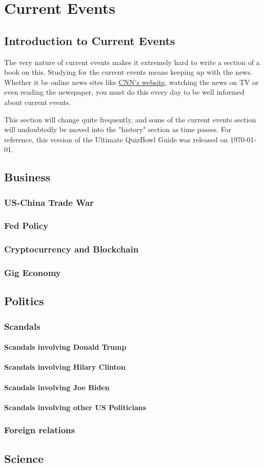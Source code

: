 \chapter{Current Events}
	\section{Introduction to Current Events}
		The very nature of current events makes it extremely hard to write a section of a book on this.  Studying for the current events means keeping up with the news.  Whether it be online news sites like \href{http://www.cnn.com}{CNN's website}, watching the news on TV or even reading the newspaper, you must do this every day to be well informed about current events.  
		
		This section will change quite frequently, and some of the current events section will undoubtedly be moved into the "history" section as time passes.  For reference, this version of the Ultimate QuizBowl Guide was released on \today. 
				
	\section{Business}
		\subsection{US-China Trade War}
		\subsection{Fed Policy}
		\subsection{Cryptocurrency and Blockchain}
		\subsection{Gig Economy}
		
	\section{Politics}
		\subsection{Scandals}
			\subsubsection{Scandals involving Donald Trump}
			\subsubsection{Scandals involving Hilary Clinton}
			\subsubsection{Scandals involving Joe Biden}
			\subsubsection{Scandals involving other US Politicians}
		\subsection{Foreign relations}	
	\section{Science}